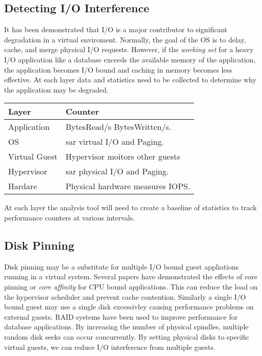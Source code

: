 \subsection{Detecting I/O Interference}
It has been demonstrated that I/O is a major contributor to significant degradation in a virtual enviroment.  Normally, the goal of the OS is to delay, cache, and merge physical I/O requests.  However, if the \emph{working set} for a heavy I/O application like a database exceeds the available memory of the application, the application becomes I/O bound and caching in memory becomes less effective.
At each layer data and statistics need to be collected to determine why the application may be degraded.
\newline

\begin{tabular}{ l p{5cm} }
  Layer & Counter \\
  \hline
  Application & BytesRead/s BytesWritten/s. \\
  OS & sar virtual I/O and Paging. \\
  Virtual Guest & Hypervisor moitors other guests \\
  Hypervisor & sar physical I/O and Paging. \\
  Hardare & Physical hardware measures IOPS. \\
\end{tabular}

\indent At each layer the analysis tool will need to create a baseline of statistics to track performance counters at various intervals.

\subsection{Disk Pinning}
Disk pinning may be a substitute for multiple I/O bound guest appliations running in a virtual system.  Several papers have demonstrated the effects of core pinning or \emph{core affinity} for CPU bound applications.  This can reduce the load on the hypervisor scheduler and prevent cache contention.  Similarly a single I/O bound guest may use a single disk excessivley causing performance problems on external guests.  RAID systems have been used to improve performance for database applications.  By increasing the number of physical spindles, multiple random disk seeks can occur concurrently.  By setting physical disks to specific virtual guests, we can reduce I/O interference from multiple guests.
